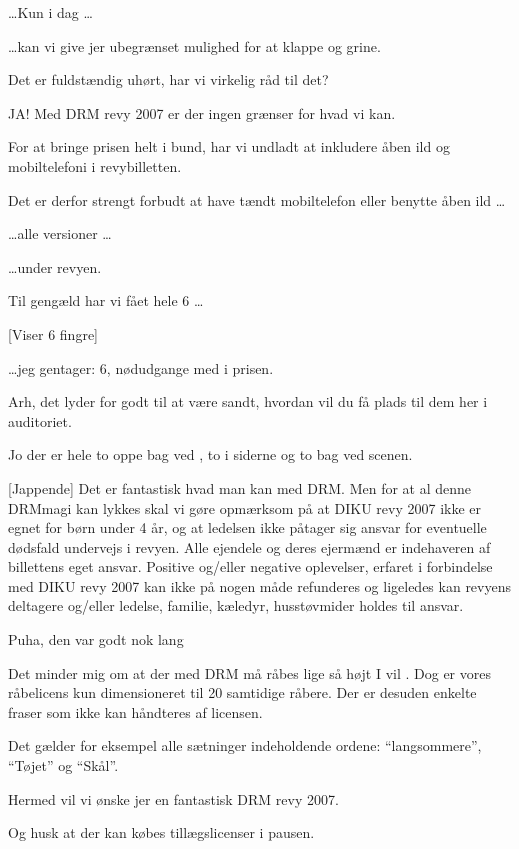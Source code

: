 \documentclass[a4paper,11pt]{article}
\begin{document}
\begin{sketch}
 \dots Kun i dag \dots

 \dots kan vi give jer ubegrænset mulighed for at klappe og
grine.

 Det er fuldstændig uhørt, har vi virkelig råd til det?

 JA! Med DRM revy 2007 er der ingen grænser for hvad vi kan.

 For at bringe prisen helt i bund, har vi undladt at
inkludere åben ild og mobiltelefoni i revybilletten. 

 Det er derfor strengt forbudt at have tændt mobiltelefon
eller benytte åben ild \ldots

 \ldots alle versioner \ldots

 \ldots under revyen.

 Til gengæld har vi fået hele 6 \ldots

[Viser 6 fingre]

 \ldots jeg gentager: 6, nødudgange med i prisen.

 Arh, det lyder for godt til at være sandt, hvordan vil du få
plads til dem her i auditoriet.

 Jo der er hele to oppe bag ved , to i siderne og to bag ved scenen.

[Jappende] Det er fantastisk hvad man kan med DRM. Men for at al denne DRMmagi kan
lykkes skal vi gøre opmærksom på at DIKU revy
2007 ikke er egnet for børn under 4 år, og at ledelsen ikke påtager
sig ansvar for eventuelle dødsfald undervejs i revyen. Alle ejendele
og deres ejermænd er indehaveren af billettens eget ansvar. Positive
og/eller negative oplevelser, erfaret i forbindelse med DIKU revy
2007 kan ikke på nogen måde refunderes og ligeledes kan revyens
deltagere og/eller ledelse, familie, kæledyr, husstøvmider holdes til ansvar.

 Puha, den var godt nok lang 

 Det minder mig om at der med DRM må råbes lige så højt I vil
. Dog er vores
råbelicens kun dimensioneret til 20 samtidige råbere. Der er desuden
enkelte fraser som ikke kan håndteres af licensen.

 Det gælder for eksempel alle sætninger indeholdende ordene:
``langsommere'', ``Tøjet'' og ``Skål''.

 Hermed vil vi ønske jer en fantastisk DRM revy 2007. 

 Og husk at der kan købes tillægslicenser i pausen.



\end{sketch}
\end{document}
